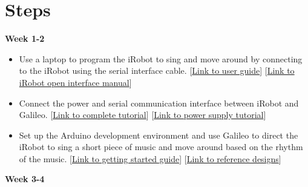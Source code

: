 \documentclass[11pt]{article} %
\begin{document}
\section{Steps}

\textbf{Week 1-2}
\begin{itemize}
\item Use a laptop to program the iRobot to sing and move around by connecting to the iRobot using the serial interface cable.
[\href{http://www.irobot.com/filelibrary/pdfs/hrd/create/Create\%20Manual_Final.pdf}{Link to user guide}] [\href{http://www.irobot.com/filelibrary/pdfs/hrd/create/Create\%20Open\%20Interface_v2.pdf}{Link to iRobot open interface manual}]

\item Connect the power and serial communication interface between iRobot and Galileo. [\href{http://www.instructables.com/id/Voice-Controlled-iRobot-Create/?ALLSTEPS}{Link to complete tutorial}] [\href{https://www.sparkfun.com/tutorials/57}{Link to power supply tutorial}]

\item Set up the Arduino development environment and use Galileo to direct the iRobot to sing a short piece of music and move around based on the rhythm of the music.
[\href{https://communities.intel.com/docs/DOC-21838}{Link to getting started guide}] [\href{https://communities.intel.com/docs/DOC-21824}{Link to reference designs}]
\end{itemize}
\textbf{Week 3-4}
\end{document}
